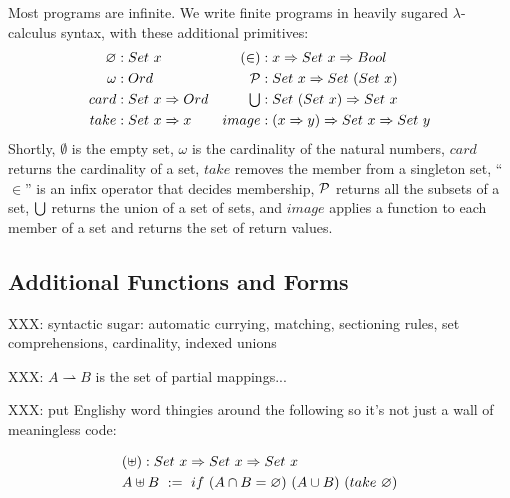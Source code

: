 \documentclass[preprint]{sigplanconf}
\newcommand{\pto}{\rightharpoonup}
\begin{document}
Most \lzfclang programs are infinite.
We write finite programs in heavily sugared $\lambda$-calculus syntax, with these additional primitives:
\begin{equation}
\begin{aligned}
	\begin{aligned}
		\varnothing &: Set~x \\
		\omega &: Ord \\
		card &: Set~x \Rightarrow Ord \\
		take &: Set~x \Rightarrow x \\
	\end{aligned}
	&\ \ \ 
	\begin{aligned}
		(\in) &: x \Rightarrow Set~x \Rightarrow Bool \\
		\mathcal{P} &: Set~x \Rightarrow Set~(Set~x) \\
		\textstyle\bigcup &: Set~(Set~x) \Rightarrow Set~x \\
		image &: (x \Rightarrow y) \Rightarrow Set~x \Rightarrow Set~y \\
	\end{aligned} \\
\end{aligned}
\end{equation}
Shortly, $\emptyset$ is the empty set, $\omega$ is the cardinality of the natural numbers, $card$ returns the cardinality of a set, $take$ removes the member from a singleton set, ``$\in$'' is an infix operator that decides membership, $\mathcal{P}$ returns all the subsets of a set, $\textstyle\bigcup$ returns the union of a set of sets, and $image$ applies a function to each member of a set and returns the set of return values.

\subsection{Additional Functions and Forms}

XXX: syntactic sugar: automatic currying, matching, sectioning rules, set comprehensions, cardinality, indexed unions

XXX: $A \pto B$ is the set of partial mappings...

XXX: put Englishy word thingies around the following so it's not just a wall of meaningless code:

\begin{equation}
\begin{aligned}
	&(\uplus) : Set~x \Rightarrow Set~x \Rightarrow Set~x \\
	&A \uplus B \ := \ if~(A \cap B = \varnothing)~(A \cup B)~(take~\varnothing)
\end{aligned}
\end{equation}
\end{document}

